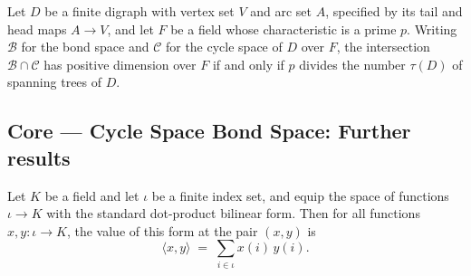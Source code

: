 \begin{theorem}
\label{CycleSpace.finrank_inf_pos_iff_dvd_tau}
\leanok
{}
Let $D$ be a finite digraph with vertex set $V$ and arc set $A$, specified by its tail
and head maps $A \to V$, and let $F$ be a field whose characteristic is a prime $p$.
Writing $\mathcal{B}$ for the bond space and $\mathcal{C}$ for the cycle space of $D$
over $F$, the intersection $\mathcal{B} \cap \mathcal{C}$ has positive dimension over
$F$ if and only if $p$ divides the number $\tau(D)$ of spanning trees of $D$.
\end{theorem}

\subsection*{Core --- Cycle Space Bond Space: Further results}

\begin{theorem}
\label{CycleSpace.dotForm_apply}
\leanok
{}
Let $K$ be a field and let $\iota$ be a finite index set, and equip the space of
functions $\iota \to K$ with the standard dot-product bilinear form. Then for all
functions $x, y \colon \iota \to K$, the value of this form at the pair $(x, y)$ is
\[
\langle x, y \rangle \;=\; \sum_{i \in \iota} x(i)\, y(i).
\]
\end{theorem}
